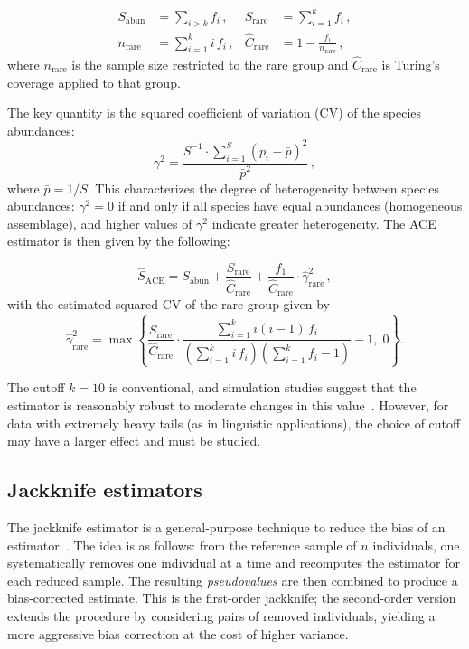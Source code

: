 ﻿\documentclass{article}
\begin{document}
\begin{align*}
    S_{\mathrm{abun}} &= \sum_{i > k} f_i\,,  &
    S_{\mathrm{rare}} &= \sum_{i=1}^{k} f_i\,, \\[4pt]
    n_{\mathrm{rare}} &= \sum_{i=1}^{k} i\, f_i\,,  &
    \hat{C}_{\mathrm{rare}} &= 1 - \frac{f_1}{n_{\mathrm{rare}}}\,,
\end{align*}
where $n_{\mathrm{rare}}$ is the sample size restricted to the rare group and $\hat{C}_{\mathrm{rare}}$ is Turing's coverage applied to that group.

The key quantity is the squared coefficient of variation (CV) of the species abundances:
\begin{equation}\label{eq:cv}
    \gamma^2 = \frac{S^{-1} \cdot \sum_{i=1}^{S} (p_i - \bar{p})^2}
    {\bar{p}^2}\,,
\end{equation}
where $\bar{p} = 1/S$. This characterizes the degree of heterogeneity between species abundances: $\gamma^2 = 0$ if and only if all species have equal abundances (homogeneous assemblage), and higher values of $\gamma^2$ indicate greater heterogeneity. The ACE estimator is then given by the following:

\begin{equation}\label{eq:ace}
    \hat{S}_{\mathrm{ACE}} = S_{\mathrm{abun}} 
    + \frac{S_{\mathrm{rare}}}{\hat{C}_{\mathrm{rare}}} 
    + \frac{f_1}{\hat{C}_{\mathrm{rare}}} \cdot 
    \hat{\gamma}^2_{\mathrm{rare}}\,,
\end{equation}
with the estimated squared CV of the rare group given by
\begin{equation}\label{eq:cv_rare}
    \hat{\gamma}^2_{\mathrm{rare}} = \max\!\left\{
    \frac{S_{\mathrm{rare}}}{\hat{C}_{\mathrm{rare}}}
    \cdot
    \frac{\sum_{i=1}^{k} i(i-1)\, f_i}
    {\left(\sum_{i=1}^{k} i\, f_i\right)
     \left(\sum_{i=1}^{k} f_i - 1\right)}
    - 1,\; 0 \right\}.
\end{equation}

The cutoff $k = 10$ is conventional, and simulation studies suggest that the estimator is reasonably robust to moderate changes in this value~\cite{chaolee1992}. However, for data with extremely heavy tails (as in linguistic applications), the choice of cutoff may have a larger effect and must be studied.

\subsection{Jackknife estimators}
The jackknife estimator is a general-purpose technique to reduce the bias of an estimator~\cite{burnham1979}. The idea is as follows: from the reference sample of $n$ individuals, one systematically removes one individual at a time and recomputes the estimator for each reduced sample. The resulting \emph{pseudovalues} are then combined to produce a bias-corrected estimate. This is the first-order jackknife; the second-order version extends the procedure by considering pairs of removed individuals, yielding a more aggressive bias correction at the cost of higher variance.
 
\end{document}
